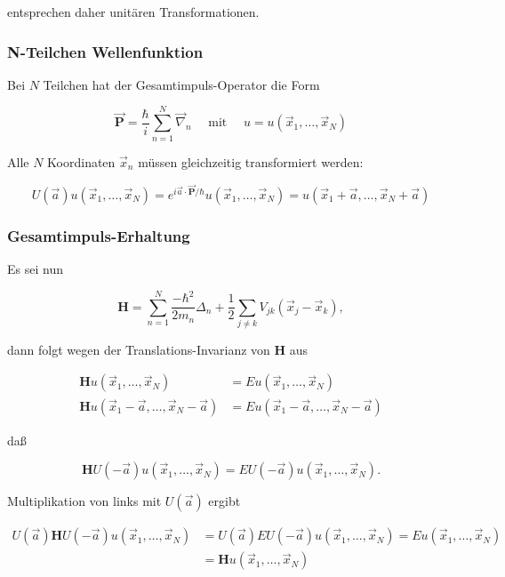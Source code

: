 \documentclass[10pt, letterpaper]{article}
\begin{document}
entsprechen daher unitären Transformationen.

\subsubsection*{N-Teilchen Wellenfunktion}
Bei $N$ Teilchen hat der Gesamtimpuls-Operator die Form

$$
\overrightarrow{\mathbf{P}}=\frac{\hbar}{i} \sum_{n=1}^{N} \vec{\nabla}_{n} \quad \text { mit } \quad u=u\left(\vec{x}_{1}, \ldots, \vec{x}_{N}\right)
$$

Alle $N$ Koordinaten $\vec{x}_{n}$ müssen gleichzeitig transformiert werden:

$$
U(\vec{a}) u\left(\vec{x}_{1}, \ldots, \vec{x}_{N}\right)=e^{i \vec{a} \cdot \overrightarrow{\mathbf{P}} / \hbar} u\left(\vec{x}_{1}, \ldots, \vec{x}_{N}\right)=u\left(\vec{x}_{1}+\vec{a}, \ldots, \vec{x}_{N}+\vec{a}\right)
$$

\subsubsection*{Gesamtimpuls-Erhaltung}
Es sei nun

$$
\mathbf{H}=\sum_{n=1}^{N} \frac{-\hbar^{2}}{2 m_{n}} \Delta_{n}+\frac{1}{2} \sum_{j \neq k} V_{j k}\left(\vec{x}_{j}-\vec{x}_{k}\right),
$$

dann folgt wegen der Translations-Invarianz von $\mathbf{H}$ aus

$$
\begin{aligned}
\mathbf{H} u\left(\vec{x}_{1}, \ldots, \vec{x}_{N}\right) & =E u\left(\vec{x}_{1}, \ldots, \vec{x}_{N}\right) \\
\mathbf{H} u\left(\vec{x}_{1}-\vec{a}, \ldots, \vec{x}_{N}-\vec{a}\right) & =E u\left(\vec{x}_{1}-\vec{a}, \ldots, \vec{x}_{N}-\vec{a}\right)
\end{aligned}
$$

daß

$$
\mathbf{H} U(-\vec{a}) u\left(\vec{x}_{1}, \ldots, \vec{x}_{N}\right)=E U(-\vec{a}) u\left(\vec{x}_{1}, \ldots, \vec{x}_{N}\right) .
$$

Multiplikation von links mit $U(\vec{a})$ ergibt

$$
\begin{aligned}
U(\vec{a}) \mathbf{H} U(-\vec{a}) u\left(\vec{x}_{1}, \ldots, \vec{x}_{N}\right) & =U(\vec{a}) E U(-\vec{a}) u\left(\vec{x}_{1}, \ldots, \vec{x}_{N}\right)=E u\left(\vec{x}_{1}, \ldots, \vec{x}_{N}\right) \\
& =\mathbf{H} u\left(\vec{x}_{1}, \ldots, \vec{x}_{N}\right)
\end{aligned}
$$
\end{document}
